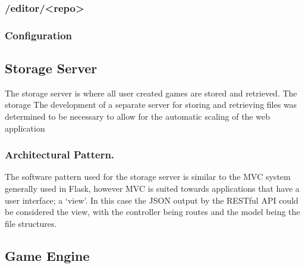 	\subsubsection{/editor/<repo>}

	\subsubsection{Configuration}



	\subsection{Storage Server}
	The storage server is where all user created games are stored and retrieved. The storage 
	The development of a separate server for storing and retrieving files was determined to be necessary to allow for the automatic scaling of the web application

	\subsubsection{Architectural Pattern.}
	The software pattern used for the storage server is similar to the MVC system generally used in Flask, however MVC is suited towards applications that have a user interface; a `view'. In this case the JSON output by the RESTful API could be considered the view, with the controller being routes and the model being the file structures.

	\subsection{Game Engine}
